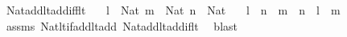 \begin{isabellebody}
\isanewline
%
\endisadelimproof
\isanewline
{}\isamarkupfalse%
\ Nat{\isacharunderscore}{\kern0pt}add{\isacharunderscore}{\kern0pt}lt{\isacharunderscore}{\kern0pt}add{\isacharunderscore}{\kern0pt}iff{\isacharunderscore}{\kern0pt}lt{\isacharcolon}{\kern0pt}\isanewline
\ \ \ {\isachardoublequoteopen}l\ {\isacharcolon}{\kern0pt}\ Nat{\isachardoublequoteclose}\ {\isachardoublequoteopen}m\ {\isacharcolon}{\kern0pt}\ Nat{\isachardoublequoteclose}\ {\isachardoublequoteopen}n\ {\isacharcolon}{\kern0pt}\ Nat{\isachardoublequoteclose}\isanewline
\ \ \ {\isachardoublequoteopen}l\ {\isacharplus}{\kern0pt}\ n\ {\isacharless}{\kern0pt}\ m\ {\isacharplus}{\kern0pt}\ n\ {\isasymlongleftrightarrow}\ l\ {\isacharless}{\kern0pt}\ m{\isachardoublequoteclose}\isanewline
%
\isadelimproof
%
\endisadelimproof
%
\isatagproof
{}\isamarkupfalse%
\ assms\ Nat{\isacharunderscore}{\kern0pt}lt{\isacharunderscore}{\kern0pt}if{\isacharunderscore}{\kern0pt}add{\isacharunderscore}{\kern0pt}lt{\isacharunderscore}{\kern0pt}add\ Nat{\isacharunderscore}{\kern0pt}add{\isacharunderscore}{\kern0pt}lt{\isacharunderscore}{\kern0pt}add{\isacharunderscore}{\kern0pt}if{\isacharunderscore}{\kern0pt}lt\ \isamarkupfalse%
\ blast%
\endisatagproof
{\isafoldproof}%
%
\isadelimproof
\isanewline
%
\endisadelimproof
\isanewline
%
\isadelimtheory
\isanewline
%
\endisadelimtheory
%
\isatagtheory
{}\isamarkupfalse%
%
\endisatagtheory
{\isafoldtheory}%
%
\isadelimtheory
%
\endisadelimtheory
%
\end{isabellebody}%
\endinput
